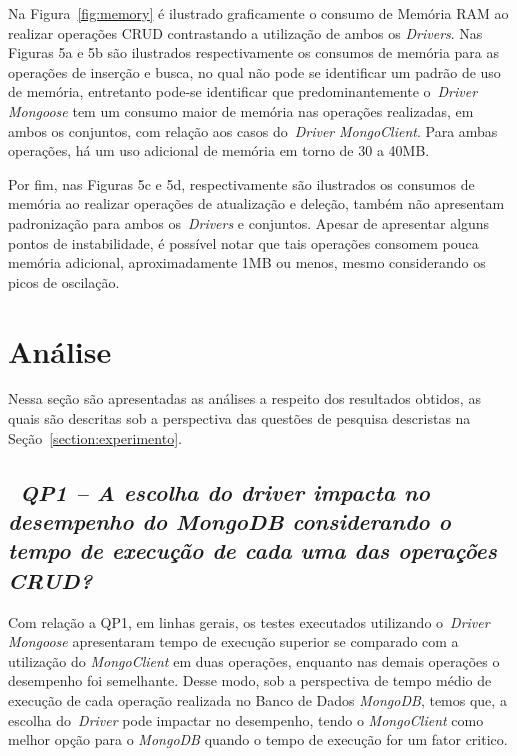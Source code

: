 \documentclass[12pt]{article}
\begin{document}
Na Figura~\ref{fig:memory} é ilustrado graficamente o consumo de Memória RAM ao realizar operações CRUD contrastando a utilização de ambos os \emph{Drivers}.
Nas Figuras 5a e 5b são ilustrados respectivamente os consumos de memória para as operações de inserção e busca, no qual não pode se identificar um padrão de uso de memória, entretanto pode-se identificar que predominantemente o~\emph{Driver} \emph{Mongoose} tem um consumo maior de memória nas operações realizadas, em ambos os conjuntos, com relação aos casos do~\emph{Driver} \emph{MongoClient}.
Para ambas operações, há um uso adicional de memória em torno de 30 a 40MB.

Por fim, nas Figuras 5c e 5d, respectivamente são ilustrados os consumos de memória ao realizar operações de atualização e deleção, também não apresentam padronização para ambos os~\emph{Drivers} e conjuntos. 
Apesar de apresentar alguns pontos de instabilidade, é possível notar que tais operações consomem pouca memória adicional, aproximadamente 1MB ou menos, mesmo considerando os picos de oscilação.

\section{Análise}
\label{section:discussao}

Nessa seção são apresentadas as análises a respeito dos resultados obtidos, as quais são descritas sob a perspectiva das questões de pesquisa descristas na Seção~\ref{section:experimento}.

\subsection{~\emph{QP1 -- A escolha do driver impacta no desempenho do MongoDB considerando o tempo de execução de cada uma das operações CRUD?}}
\label{q1}

Com relação a QP1, em linhas gerais, os testes executados utilizando o~\emph{Driver} \emph{Mongoose} apresentaram tempo de execução superior se comparado com a utilização do \emph{MongoClient} em duas operações, enquanto nas demais operações o desempenho foi semelhante.
Desse modo, sob a perspectiva de tempo médio de execução de cada operação realizada no Banco de Dados \emph{MongoDB}, temos que, a escolha do~\emph{Driver} pode impactar no desempenho, tendo o \emph{MongoClient} como melhor opção para o \emph{MongoDB} quando o tempo de execução for um fator critico.
\end{document}
